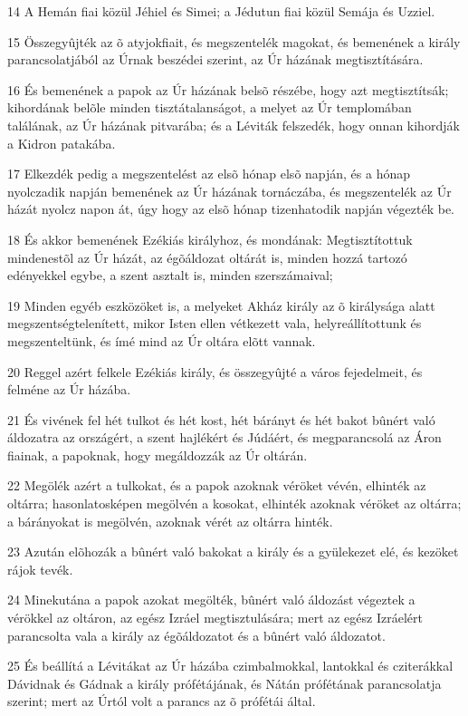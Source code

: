 \par 14 A Hemán fiai közül Jéhiel és Simei; a Jédutun fiai közül Semája és Uzziel.
\par 15 Összegyûjték az õ atyjokfiait, és megszentelék magokat, és bemenének a király parancsolatjából az Úrnak beszédei szerint, az Úr házának megtisztítására.
\par 16 És bemenének a papok az Úr házának belsõ részébe, hogy azt megtisztítsák; kihordának belõle minden tisztátalanságot, a melyet az Úr templomában találának, az Úr házának pitvarába; és a Léviták felszedék, hogy onnan kihordják a Kidron patakába.
\par 17 Elkezdék pedig a megszentelést az elsõ hónap elsõ napján, és a hónap nyolczadik napján bemenének az Úr házának tornáczába, és megszentelék az Úr házát nyolcz napon át, úgy hogy az elsõ hónap tizenhatodik napján végezték be.
\par 18 És akkor bemenének Ezékiás királyhoz, és mondának: Megtisztítottuk mindenestõl az Úr házát, az égõáldozat oltárát is, minden hozzá tartozó edényekkel egybe, a szent asztalt is, minden szerszámaival;
\par 19 Minden egyéb eszközöket is, a melyeket Akház király az õ királysága alatt megszentségtelenített, mikor Isten ellen vétkezett vala, helyreállítottunk és megszenteltünk, és ímé mind az Úr oltára elõtt vannak.
\par 20 Reggel azért felkele Ezékiás király, és összegyûjté a város fejedelmeit, és felméne az Úr házába.
\par 21 És vivének fel hét tulkot és hét kost, hét bárányt és hét bakot bûnért való áldozatra az országért, a szent hajlékért és Júdáért, és megparancsolá az Áron fiainak, a papoknak, hogy megáldozzák az Úr oltárán.
\par 22 Megölék azért a tulkokat, és a papok azoknak véröket vévén, elhinték az oltárra; hasonlatosképen megölvén a kosokat, elhinték azoknak véröket az oltárra; a bárányokat is megölvén, azoknak vérét az oltárra hinték.
\par 23 Azután elõhozák a bûnért való bakokat a király és a gyülekezet elé, és kezöket rájok tevék.
\par 24 Minekutána a papok azokat megölték, bûnért való áldozást végeztek a vérökkel az oltáron, az egész Izráel megtisztulására; mert az egész Izráelért parancsolta vala a király az égõáldozatot és a bûnért való áldozatot.
\par 25 És beállítá a Lévitákat az Úr házába czimbalmokkal, lantokkal és cziterákkal Dávidnak és Gádnak a király prófétájának, és Nátán prófétának parancsolatja szerint; mert az Úrtól volt a parancs az õ prófétái által.
